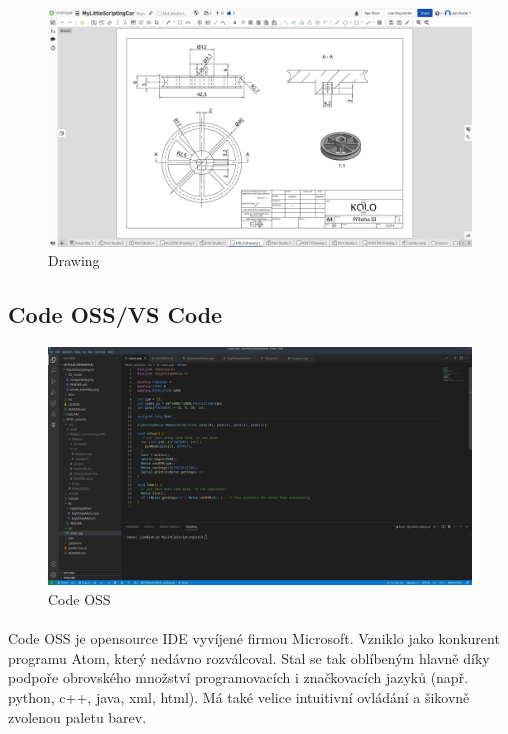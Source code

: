 \documentclass[12pt]{article}
\begin{document}
\begin{spacing}{1.5}
	\begin{figure}[H]
		\centering
		\includegraphics[width=\linewidth]{images/drawing_studio.png}
		\caption{Drawing}
		\label{fig:drawing_studio}
	\end{figure}
	
	\subsection{Code OSS/VS Code}
	
	\begin{figure}[H]
		\centering
		\includegraphics[width=\linewidth]{images/code_oss.png}
		\caption{Code OSS}
		\label{fig:code_oss}
	\end{figure}
	
	\paragraph{} Code OSS je opensource IDE vyvíjené firmou Microsoft. Vzniklo jako konkurent programu Atom, který nedávno rozválcoval. Stal se tak oblíbeným hlavně díky podpoře obrovského množství programovacích i značkovacích jazyků (např. python, c++, java, xml, html). Má také velice intuitivní ovládání a šikovně zvolenou paletu barev.
	

\end{spacing}
\end{document}

